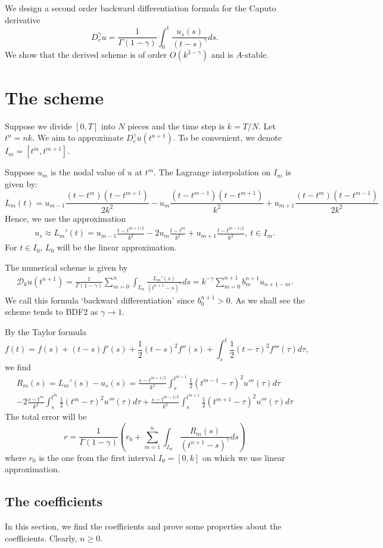 \documentclass[11pt]{article}
\begin{document}
We design a second order backward differentiation formula for the Caputo derivative $$
D_c^{\gamma}u=\frac{1}{\Gamma(1-\gamma)}\int_0^t\frac{u_s(s)}{(t-s)^{\gamma}}ds.
$$
We show that the derived scheme is of order $O(k^{3-\gamma})$
and is $A$-stable. 

\section{The scheme}
Suppose we divide $[0, T]$ into $N$ pieces and the time step is $k=T/N$. Let $t^n=nk$. We aim to approximate $D_c^{\gamma}u(t^{n+1})$. To be convenient, we denote $I_m=[t^m, t^{m+1}]$.

Suppose $u_m$ is the nodal value of $u$ at $t^m$. The Lagrange interpolation on $I_m$ is given by:
$$
L_m(t)=u_{m-1}\frac{(t-t^m)(t-t^{m+1})}{2k^2}-u_m\frac{(t-t^{m-1})(t-t^{m+1})}{k^2}+u_{m+1}\frac{(t-t^m)(t-t^{m-1})}{2k^2}
$$
Hence, we use the approximation 
\begin{gather}
u_s\approx L_m'(t)=u_{m-1}\frac{t-t^{m+1/2}}{k^2}-2u_m\frac{t-t^m}{k^2}+u_{m+1}\frac{t-t^{m-1/2}}{k^2},\ t\in I_m.
\end{gather}
For $t\in I_0$, $L_0$ will be the linear approximation.

The numerical scheme is given by
\begin{gather}
\mathcal{D}_ku(t^{n+1})=\frac{1}{\Gamma(1-\gamma)}\sum_{m=0}^n
\int_{I_m}\frac{L_m'(s)}{(t^{n+1}-s)^{\gamma}}ds=k^{-\gamma}\sum_{m=0}^{n+1}b^{n+1}_m u_{n+1-m}.
\end{gather}
We call this formula `backward differentiation' since $b_0^{n+1}>0$. As we shall see the scheme tends to BDF2 as $\gamma\to 1$.


By the Taylor formula $$
f(t)=f(s)+(t-s)f'(s)+\frac{1}{2}(t-s)^2f''(s)+\int_s^t\frac{1}{2}(t-\tau)^2 f'''(\tau)d\tau,
$$
we find 
\begin{multline}
R_m(s)=L_m'(s)-u_s(s)=\frac{s-t^{m+1/2}}{k^2}\int_s^{t^{m-1}}\frac{1}{2}(t^{m-1}-\tau)^2 u'''(\tau)d\tau\\
-2\frac{s-t^m}{k^2}\int_s^{t^m}\frac{1}{2}(t^m-\tau)^2 u'''(\tau)d\tau
+\frac{s-t^{m-1/2}}{k^2}\int_s^{t^{m+1}}\frac{1}{2}(t^{m+1}-\tau)^2 u'''(\tau)d\tau
\end{multline}
The total error will be $$
r=\frac{1}{\Gamma(1-\gamma)}\left(r_0+\sum_{m=1}^n\int_{I_m}\frac{R_m(s)}{(t^{n+1}-s)^{\gamma}}ds\right)
$$
where $r_0$ is the one from the first interval $I_0=[0, k]$ on which we use linear approximation.

\subsection{The coefficients}
In this section, we find the coefficients and prove some properties about the coefficients. Clearly, $n\ge 0$. 
\end{document}
